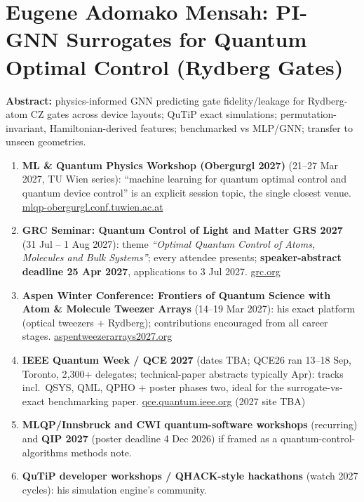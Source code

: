 \documentclass[11pt,a4paper]{article}
\begin{document}
\section{Eugene Adomako Mensah: PI-GNN Surrogates for Quantum Optimal Control (Rydberg Gates)}
\textbf{Abstract:} physics-informed GNN predicting gate fidelity/leakage for Rydberg-atom CZ gates across device layouts; QuTiP exact simulations; permutation-invariant, Hamiltonian-derived features; benchmarked vs MLP/GNN; transfer to unseen geometries.
\begin{enumerate}[leftmargin=1.6em]
  \item \textbf{ML \& Quantum Physics Workshop (Obergurgl 2027)} (21--27 Mar 2027, TU Wien series): ``machine learning for quantum optimal control and quantum device control'' is an explicit session topic, the single closest venue. \href{https://mlqp-obergurgl.conf.tuwien.ac.at/}{mlqp-obergurgl.conf.tuwien.ac.at}
  \item \textbf{GRC Seminar: Quantum Control of Light and Matter GRS 2027} (31 Jul -- 1 Aug 2027): theme \emph{``Optimal Quantum Control of Atoms, Molecules and Bulk Systems''}; every attendee presents; \textbf{speaker-abstract deadline 25 Apr 2027}, applications to 3 Jul 2027. \href{https://www.grc.org/quantum-control-of-light-and-matter-grs-conference/2027/}{grc.org}
  \item \textbf{Aspen Winter Conference: Frontiers of Quantum Science with Atom \& Molecule Tweezer Arrays} (14--19 Mar 2027): his exact platform (optical tweezers $+$ Rydberg); contributions encouraged from all career stages. \href{https://www.aspentweezerarrays2027.org/}{aspentweezerarrays2027.org}
  \item \textbf{IEEE Quantum Week / QCE 2027} (dates TBA; QCE26 ran 13--18 Sep, Toronto, 2{,}300+ delegates; technical-paper abstracts typically Apr): tracks incl.\ QSYS, QML, QPHO $+$ poster phases two, ideal for the surrogate-vs-exact benchmarking paper. \href{https://qce.quantum.ieee.org/2026/}{qce.quantum.ieee.org} (2027 site TBA)
  \item \textbf{MLQP/Innsbruck and CWI quantum-software workshops} (recurring) and \textbf{QIP 2027} (poster deadline 4 Dec 2026) if framed as a quantum-control-algorithms methods note.
  \item \textbf{QuTiP developer workshops / QHACK-style hackathons} (watch 2027 cycles): his simulation engine's community.
\end{enumerate}
\end{document}
